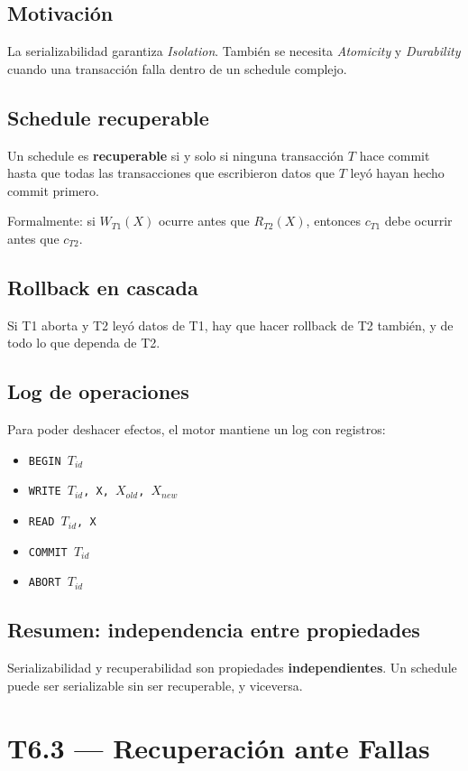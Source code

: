 \documentclass[12pt, a4paper]{article}
\begin{document}
\subsection{Motivación}
La serializabilidad garantiza \textit{Isolation}. También se necesita \textit{Atomicity} y \textit{Durability} cuando una transacción falla dentro de un schedule complejo.

\subsection{Schedule recuperable}
Un schedule es \textbf{recuperable} si y solo si ninguna transacción $T$ hace commit hasta que todas las transacciones que escribieron datos que $T$ leyó hayan hecho commit primero.

Formalmente: si $W_{T1}(X)$ ocurre antes que $R_{T2}(X)$, entonces $c_{T1}$ debe ocurrir antes que $c_{T2}$.

\subsection{Rollback en cascada}
Si T1 aborta y T2 leyó datos de T1, hay que hacer rollback de T2 también, y de todo lo que dependa de T2.

\subsection{Log de operaciones}
Para poder deshacer efectos, el motor mantiene un log con registros:
\begin{itemize}
  \item \texttt{BEGIN $T_{id}$}
  \item \texttt{WRITE $T_{id}$, X, $X_{old}$, $X_{new}$}
  \item \texttt{READ $T_{id}$, X}
  \item \texttt{COMMIT $T_{id}$}
  \item \texttt{ABORT $T_{id}$}
\end{itemize}

\subsection{Resumen: independencia entre propiedades}
Serializabilidad y recuperabilidad son propiedades \textbf{independientes}. Un schedule puede ser serializable sin ser recuperable, y viceversa.

\section{T6.3 — Recuperación ante Fallas}
\end{document}

